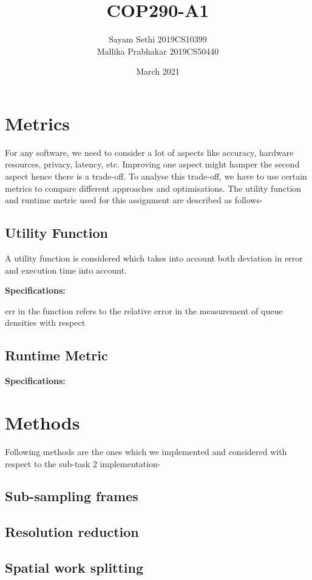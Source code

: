 \documentclass{article}
\title{COP290-A1}
\author{Sayam Sethi 2019CS10399 \\ Mallika Prabhakar 2019CS50440 }
\date{March 2021}
\begin{document}
\maketitle

\section{Metrics}
For any software, we need to consider a lot of aspects like accuracy, hardware resources, privacy, latency, etc. Improving one aspect might hamper the second aspect hence there is a trade-off. To analyse this trade-off, we have to use certain metrics to compare different approaches and optimisations. The utility function and runtime metric used for this assignment are described as follows-

\subsection{Utility Function}
A utility function is considered which takes into account both deviation in error and execution time into account.

\textbf{Specifications:}

err in the function refers to the relative error in the measurement of queue densities with respect

\subsection{Runtime Metric}


\textbf{Specifications: }


\section{Methods}
Following methods are the ones which we implemented and considered with respect to the sub-task 2 implementation-

\subsection{Sub-sampling frames}
\subsection{Resolution reduction}
\subsection{Spatial work splitting}
\end{document}
